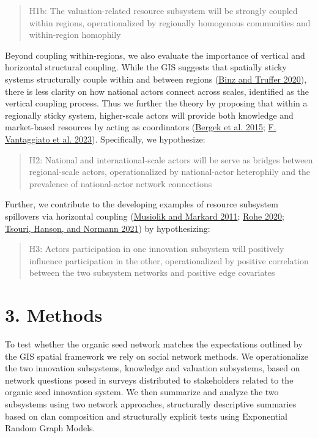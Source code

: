 \documentclass[twoside,12pt,final]{ucthesis-CA2012}
\begin{document}
\begin{ucmainmatter}
\begin{quote}
H1b: The valuation-related resource subsystem will be strongly coupled
within regions, operationalized by regionally homogenous communities
and within-region homophily
\end{quote}
Beyond coupling within-regions, we also evaluate the importance of
vertical and horizontal structural coupling. While the GIS suggests that
spatially sticky systems structurally couple within and between regions
(\protect\hyperlink{ref-Binz_Truffer_2020}{Binz and Truffer 2020}), there
is less clarity on how national actors connect across scales, identified
as the vertical coupling process. Thus we further the theory by
proposing that within a regionally sticky system, higher-scale actors
will provide both knowledge and market-based resources by acting as
coordinators
(\protect\hyperlink{ref-Bergek_Hekkert_Jacobsson_Markard_Sanduxe9n_Truffer_2015}{Bergek et al. 2015}; \protect\hyperlink{ref-Vantaggiato_Lubell_Hummel_Chow_Tcheukam_Siwe_2023}{F. Vantaggiato et al. 2023}). Specifically, we
hypothesize:
\begin{quote}
H2: National and international-scale actors will be serve as bridges
between regional-scale actors, operationalized by national-actor
heterophily and the prevalence of national-actor network connections
\end{quote}
Further, we contribute to the developing examples of resource subsystem
spillovers via horizontal coupling
(\protect\hyperlink{ref-Musiolik_Markard_2011}{Musiolik and Markard 2011}; \protect\hyperlink{ref-Rohe_2020}{Rohe 2020}; \protect\hyperlink{ref-Tsouri_Hanson_Normann_2021}{Tsouri, Hanson, and Normann 2021})
by hypothesizing:
\begin{quote}
H3: Actors\textquotesingle{} participation in one innovation subsystem will positively
influence participation in the other, operationalized by positive
correlation between the two subsystem networks and positive edge
covariates
\end{quote}
\hypertarget{methods-1}{%
\section{3. Methods}\label{methods-1}}

To test whether the organic seed network matches the expectations
outlined by the GIS spatial framework we rely on social network methods.
We operationalize the two innovation subsystems, knowledge and valuation
subsystems, based on network questions posed in surveys distributed to
stakeholders related to the organic seed innovation system. We then
summarize and analyze the two subsystems using two network approaches,
structurally descriptive summaries based on clan composition and
structurally explicit tests using Exponential Random Graph Models.


\end{ucmainmatter}
\end{document}
